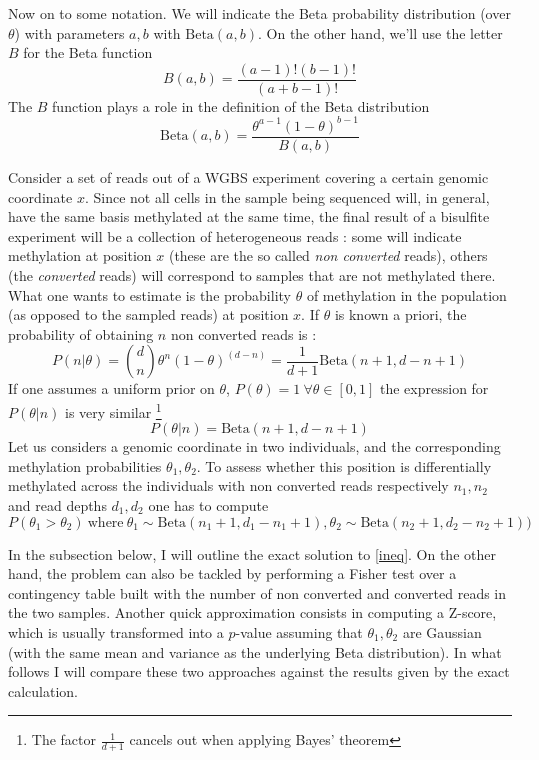 \documentclass[11pt]{amsart}
\begin{document}
Now on to some notation. We will indicate the Beta probability distribution (over $\theta$) with parameters $a,b$ with $\mbox{Beta}(a,b)$. On the other hand, we'll use the letter $B$ for the Beta function 
\[B(a,b)=\frac{(a-1)!(b-1)!}{(a+b-1)!}\] The $B$ function plays a role in the definition of the Beta distribution \[\mbox{Beta}(a,b)=\frac{\theta^{a-1}(1-\theta)^{b-1}}{B(a,b)}\]
 
Consider a set of reads out of a WGBS experiment covering a certain genomic coordinate $x$. Since not all cells in the sample being sequenced will, in general,  have the same basis methylated at the same time, the final result of a bisulfite experiment will be a collection of heterogeneous reads : some will indicate methylation at position $x$ (these are the so called {\em non converted} reads), others (the {\em converted} reads) will correspond to samples that are not methylated there. What one wants to estimate is the probability $\theta$ of methylation in the population (as opposed to the sampled reads) at position $x$.  If $\theta$ is known a priori, the probability of obtaining $n$ non converted reads is :
\[P(n|\theta)={d \choose n}\theta^n ({1-\theta})^{(d-n)}=\frac{1}{d+1}\mbox{Beta}(n+1,d-n+1)\]
If one assumes a uniform prior on $\theta$, $P(\theta)=1 \ \forall \theta \in [0,1]$ the expression for $P(\theta|n)$ is very similar \footnote{The factor $\frac{1}{d+1}$ cancels out when applying Bayes' theorem}
\[P(\theta|n)=\mbox{Beta}(n+1,d-n+1)\]
Let us considers a genomic coordinate in two individuals, and the corresponding methylation probabilities $\theta_1,\theta_2$. 
To assess whether this position is differentially methylated across the individuals with non converted reads respectively $n_1,n_2$ and read depths $d_1,d_2$ one
has to compute 
\[P(\theta_1>\theta_2) \ \mbox{where} \ \theta_1 \sim \mbox{Beta}(n_1+1,d_1-n_1+1) , \theta_2 \sim \mbox{Beta}(n_2+1,d_2-n_2+1))\]\label{ineq}

In the subsection below, I will outline the exact solution to \ref{ineq}. On the other hand, the problem can also be tackled by performing a Fisher test over a contingency table built with the number of non converted and converted reads in the two samples. Another quick approximation consists in computing a Z-score, which is usually transformed into a $p$-value assuming that $\theta_1,\theta_2$ are Gaussian (with the same mean and variance as the underlying Beta distribution). In what follows I will compare these two approaches against the results given by the exact calculation.
 
\end{document}
